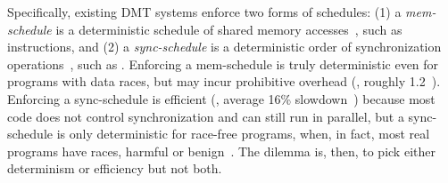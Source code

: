 




Specifically, existing DMT systems enforce two forms of schedules: (1) a
\emph{mem-schedule} is a deterministic schedule of shared memory
accesses~\cite{dmp:asplos09,coredet:asplos10,dos:osdi10}, such as
 instructions, and (2) a \emph{sync-schedule} is a
deterministic order of synchronization
operations~\cite{kendo:asplos09,cui:tern:osdi10}, such as
.  Enforcing a mem-schedule is truly deterministic even
for programs with data races, but may incur prohibitive overhead (\eg,
roughly 1.2\X~\cite{coredet:asplos10}).  Enforcing a sync-schedule is
efficient (\eg, average 16\% slowdown~\cite{kendo:asplos09}) because
most code does not control synchronization and can still run in
parallel, but a sync-schedule is only deterministic for race-free
programs, when, in fact, most real programs have races, harmful or
benign~\cite{lu:concurrency-bugs,syncfinder:osdi10}.  The dilemma is,
then, to pick either determinism or efficiency but not both.

